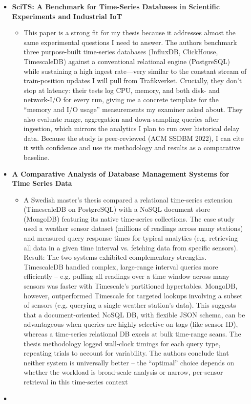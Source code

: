 \documentclass[11pt]{article}
\begin{document}
\begin{itemize}
\begin{itemize}
    \end{itemize}
    \item[] \textbf{SciTS: A Benchmark for Time-Series Databases in Scientific Experiments and Industrial IoT}
    \begin{itemize}
        \item[] This paper is a strong fit for my thesis because it addresses almost the same experimental questions I need to answer. The authors benchmark three purpose-built time-series databases (InfluxDB, ClickHouse, TimescaleDB) against a conventional relational engine (PostgreSQL) while sustaining a high ingest rate—very similar to the constant stream of train-position updates I will pull from Trafikverket. Crucially, they don’t stop at latency: their tests log CPU, memory, and both disk- and network-I/O for every run, giving me a concrete template for the “memory and I/O usage” measurements my examiner asked about. They also evaluate range, aggregation and down-sampling queries after ingestion, which mirrors the analytics I plan to run over historical delay data. Because the study is peer-reviewed (ACM SSDBM 2022), I can cite it with confidence and use its methodology and results as a comparative baseline.
    \end{itemize}
    \item[] \textbf{A Comparative Analysis of Database Management Systems for Time Series Data}
    \begin{itemize}
        \item[] A Swedish master’s thesis compared a relational time-series extension (TimescaleDB on PostgreSQL) with a NoSQL document store (MongoDB) featuring its native time-series collections. The case study used a weather sensor dataset (millions of readings across many stations) and measured query response times for typical analytics (e.g. retrieving all data in a given time interval vs. fetching data from specific sensors). Result: The two systems exhibited complementary strengths. TimescaleDB handled complex, large-range interval queries more efficiently – e.g. pulling all readings over a time window across many sensors was faster with Timescale’s partitioned hypertables. MongoDB, however, outperformed Timescale for targeted lookups involving a subset of sensors (e.g. querying a single weather station’s data). This suggests that a document-oriented NoSQL DB, with flexible JSON schema, can be advantageous when queries are highly selective on tags (like sensor ID), whereas a time-series relational DB excels at bulk time-range scans. The thesis methodology logged wall-clock timings for each query type, repeating trials to account for variability. The authors conclude that neither system is universally better – the “optimal” choice depends on whether the workload is broad-scale analysis or narrow, per-sensor retrieval in this time-series context
    \end{itemize}
    \item[] \textbf{} 
\end{itemize}
\end{document}
